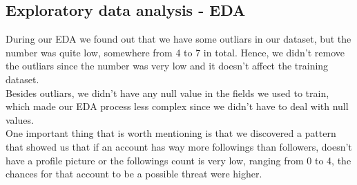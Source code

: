 \subsection{Exploratory data analysis - EDA}
During our EDA we found out that we have some outliars in our dataset, but the number was quite low, somewhere from 4 to 7
in total. Hence, we didn't remove the outliars since the number was very low and it doesn't affect the training dataset.
\\[5pt]
Besides outliars, we didn't have any null value in the fields we used to train, which made our EDA process less complex
since we didn't have to deal with null values.
\\[5pt]
One important thing that is worth mentioning is that we discovered a pattern that showed us that if an account has
way more followings than followers, doesn't have a profile picture or the followings count is very low, ranging from 0 to 4, the
chances for that account to be a possible threat were higher.
